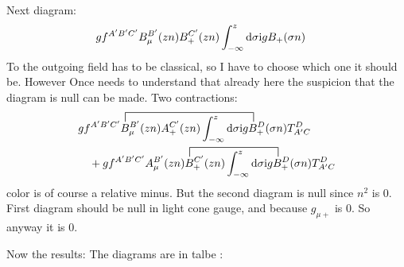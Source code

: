 Next diagram:\\
\begin{align}
	&
	gf^{A'B'C'} B_\mu^{B'}(zn)B_+^{C'}(zn) \int_{-\infty} ^{z} \text{d} \sigma \text{i} g B_+(\sigma n) 
\end{align}
To the outgoing field has to be classical, so I have to choose which one it should be. However Once needs to understand that already here the suspicion that the diagram is null can be made. Two contractions:
\begin{align}
&
\contraction[2ex]{gf^{A'B'C'} }{B}{_\mu^{B'}(zn)A_+^{C'}(zn) \int_{-\infty} ^{z} \dx \sigma \imag g}{B}
gf^{A'B'C'} B_\mu^{B'}(zn)A_+^{C'}(zn) \int_{-\infty} ^{z} \dx \sigma \imag g B_+^D(\sigma n)T^D_{A'C}
\nl
\contraction[2ex]{+gf^{A'B'C'} A_\mu^{B'}(zn)}{B}{_+^{C'}(zn) \int_{-\infty} ^{z} \dx \sigma \imag g }{B}
+gf^{A'B'C'} A_\mu^{B'}(zn)B_+^{C'}(zn) \int_{-\infty} ^{z} \dx \sigma \imag g B_+^D(\sigma n)T^D_{A'C} 
\end{align}
color is of course a relative minus. But the second diagram is null since $n^2$ is 0. First diagram should be null in light cone gauge, and because $g_{\mu +} $ is 0. So anyway it is 0.

Now the results:
The diagrams are in talbe :

